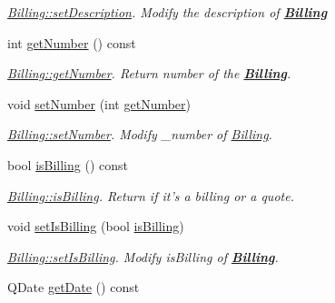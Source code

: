 \begin{DoxyCompactItemize}
\begin{DoxyCompactList}\small\item\em \hyperlink{classModels_1_1Billing_adb5cf4382150387f10bb6b774ace6bc8}{Billing\-::set\-Description}. Modify the description of {\bfseries \hyperlink{classModels_1_1Billing}{Billing}} \end{DoxyCompactList}\item 
int \hyperlink{classModels_1_1Billing_a48c6e28a4aec13f8ed6b3ebbab837f0b}{get\-Number} () const 
\begin{DoxyCompactList}\small\item\em \hyperlink{classModels_1_1Billing_a48c6e28a4aec13f8ed6b3ebbab837f0b}{Billing\-::get\-Number}. Return number of the {\bfseries \hyperlink{classModels_1_1Billing}{Billing}}. \end{DoxyCompactList}\item 
void \hyperlink{classModels_1_1Billing_a2b43e0c657a9e717c9d2c091d222369e}{set\-Number} (int \hyperlink{classModels_1_1Billing_a48c6e28a4aec13f8ed6b3ebbab837f0b}{get\-Number})
\begin{DoxyCompactList}\small\item\em \hyperlink{classModels_1_1Billing_a2b43e0c657a9e717c9d2c091d222369e}{Billing\-::set\-Number}. Modify {\itshape \-\_\-number} of \hyperlink{classModels_1_1Billing}{Billing}. \end{DoxyCompactList}\item 
bool \hyperlink{classModels_1_1Billing_ab03dd29a9812a995355a1d93318f348f}{is\-Billing} () const 
\begin{DoxyCompactList}\small\item\em \hyperlink{classModels_1_1Billing_ab03dd29a9812a995355a1d93318f348f}{Billing\-::is\-Billing}. Return if it's a billing or a quote. \end{DoxyCompactList}\item 
void \hyperlink{classModels_1_1Billing_aff8b71426c02bc97f0a724ef762cd42e}{set\-Is\-Billing} (bool \hyperlink{classModels_1_1Billing_ab03dd29a9812a995355a1d93318f348f}{is\-Billing})
\begin{DoxyCompactList}\small\item\em \hyperlink{classModels_1_1Billing_aff8b71426c02bc97f0a724ef762cd42e}{Billing\-::set\-Is\-Billing}. Modify {\itshape is\-Billing} of {\bfseries \hyperlink{classModels_1_1Billing}{Billing}}. \end{DoxyCompactList}\item 
Q\-Date \hyperlink{classModels_1_1Billing_af0d1f0132d0902fb96456d0a9018b701}{get\-Date} () const 

\end{DoxyCompactItemize}
